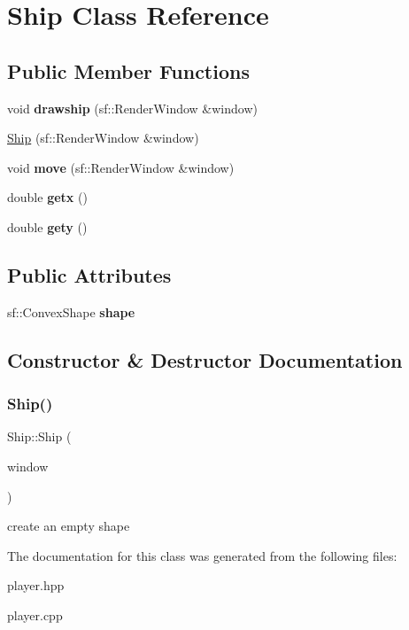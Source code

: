\hypertarget{class_ship}{}\section{Ship Class Reference}
\label{class_ship}
\subsection*{Public Member Functions}
\begin{DoxyCompactItemize}
\item 
\mbox{\label{class_ship_a9737830ea05cf59987102e820aef79e5}} 
void {\bfseries drawship} (sf\+::\+Render\+Window \&window)
\item 
\mbox{\hyperlink{class_ship_abb7c33efe77fc5179d23480320aa7a53}{Ship}} (sf\+::\+Render\+Window \&window)
\item 
\mbox{\label{class_ship_a6be1244d0b6f6e90551b87a47645a177}} 
void {\bfseries move} (sf\+::\+Render\+Window \&window)
\item 
\mbox{\label{class_ship_a1feb260789c1d41a22e572464c5679b3}} 
double {\bfseries getx} ()
\item 
\mbox{\label{class_ship_a4e325acd5eb50717a2bc985c8a5e63e3}} 
double {\bfseries gety} ()
\end{DoxyCompactItemize}
\subsection*{Public Attributes}
\begin{DoxyCompactItemize}
\item 
\mbox{\label{class_ship_aa6cceca11076eaf79737a9911d26da36}} 
sf\+::\+Convex\+Shape {\bfseries shape}
\end{DoxyCompactItemize}


\subsection{Constructor \& Destructor Documentation}
\mbox{\label{class_ship_abb7c33efe77fc5179d23480320aa7a53}} 
\subsubsection{\texorpdfstring{Ship()}{Ship()}}
{\footnotesize\ttfamily Ship\+::\+Ship (\begin{DoxyParamCaption}\item[{sf\+::\+Render\+Window \&}]{window }\end{DoxyParamCaption})}

create an empty shape 

The documentation for this class was generated from the following files\+:\begin{DoxyCompactItemize}
\item 
player.\+hpp\item 
player.\+cpp\end{DoxyCompactItemize}
